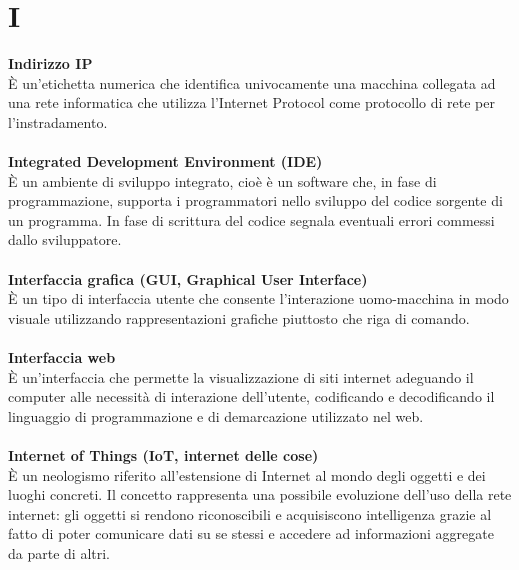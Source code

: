 \section{I}
\textbf{Indirizzo IP}\\
È un'etichetta numerica che identifica univocamente una macchina collegata ad una rete informatica che utilizza l'Internet Protocol come protocollo di rete per l'instradamento. \\ \\
\textbf{Integrated Development Environment (IDE)}\\
È un ambiente di sviluppo integrato, cioè è un software che, in fase di programmazione, supporta i programmatori nello sviluppo del codice sorgente di un programma. In fase di scrittura del codice segnala eventuali errori commessi dallo sviluppatore. \\ \\
\textbf{Interfaccia grafica (GUI, Graphical User Interface)}\\
È un tipo di interfaccia utente che consente l'interazione uomo-macchina in modo visuale utilizzando rappresentazioni grafiche piuttosto che riga di comando. \\ \\
\textbf{Interfaccia web}\\
È un'interfaccia che permette la visualizzazione di siti internet adeguando il computer alle necessità di interazione dell'utente, codificando e decodificando il linguaggio di programmazione e di demarcazione utilizzato nel web. \\ \\
\textbf{Internet of Things (IoT, internet delle cose)}\\
È un neologismo riferito all'estensione di Internet al mondo degli oggetti e dei luoghi concreti. Il concetto rappresenta una possibile evoluzione dell'uso della rete internet: gli oggetti si rendono riconoscibili e acquisiscono intelligenza grazie al fatto di poter comunicare dati su se stessi e accedere ad informazioni aggregate da parte di altri. \\ \\
\clearpage

